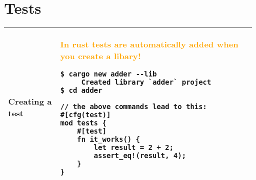 \documentclass[main.tex,fontsize=8pt,paper=a4,paper=portrait,DIV=calc,]{scrartcl}
\begin{document}
\begin{table}[ht!]
\section{Tests}
\begin{tabular}{|m{0.2\linewidth}|m{0.755\linewidth}|}
\hline
Creating a test &
\textcolor{orange}{In rust tests are automatically added when you create a libary!}\newline
\begin{lstlisting}
$ cargo new adder --lib
     Created library `adder` project
$ cd adder

// the above commands lead to this:
#[cfg(test)]
mod tests {
    #[test]
    fn it_works() {
        let result = 2 + 2;
        assert_eq!(result, 4);
    }
}
\end{lstlisting}\\
\hline
\end{tabular}
\end{table}
\pagebreak
\end{document}
